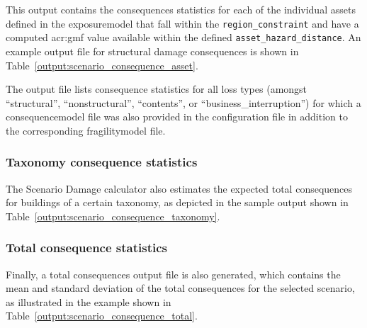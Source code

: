 This output contains the consequences statistics for each of the individual
\glspl{asset} defined in the \gls{exposuremodel} that fall within the
\Verb+region_constraint+ and have a computed \gls{acr:gmf} value available
within the defined \Verb+asset_hazard_distance+. An example output file for
structural damage consequences is shown in
Table~\ref{output:scenario_consequence_asset}.



The output file lists consequence statistics for all loss types (amongst
``structural'', ``nonstructural'', ``contents'', or
``business\_interruption'') for which a \gls{consequencemodel} file was also
provided in the configuration file in addition to the corresponding
\gls{fragilitymodel} file.


\subsubsection{Taxonomy consequence statistics}
\label{subsubsec:scenario_taxonomy_consequence_statistics}

The Scenario Damage calculator also estimates the expected total consequences
for buildings of a certain \gls{taxonomy}, as depicted in the sample output
shown in Table~\ref{output:scenario_consequence_taxonomy}.




\subsubsection{Total consequence statistics}
\label{subsubsec:scenario_total_consequence_statistics}

Finally, a total consequences output file is also generated, which contains
the mean and standard deviation of the total consequences for the selected
scenario, as illustrated in the example shown in
Table~\ref{output:scenario_consequence_total}.

